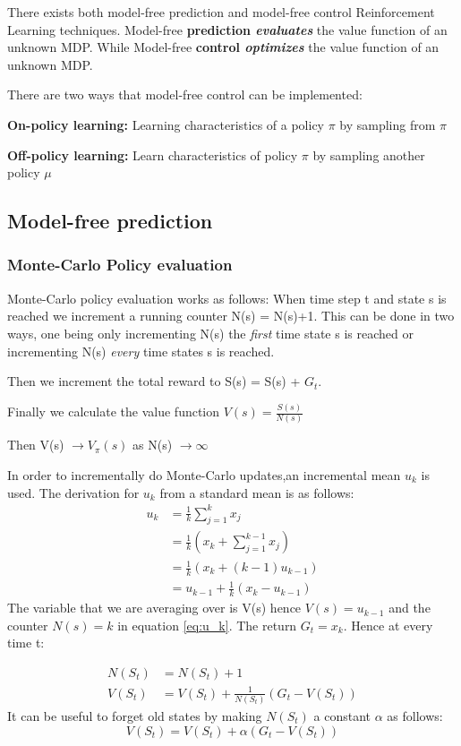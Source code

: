 There exists both model-free prediction and model-free control Reinforcement Learning techniques.
Model-free \textbf{prediction \textit{evaluates}} the value function of an unknown MDP.
While Model-free \textbf{control \textit{optimizes}} the value function of an unknown MDP.

There are two ways that model-free control can be implemented:

\textbf{On-policy learning:}
Learning characteristics of a policy $\pi$ by sampling from $\pi$

\textbf{Off-policy learning:}
Learn characteristics of policy $\pi$ by sampling another policy $\mu$

\subsection{Model-free prediction}
\subsubsection{Monte-Carlo Policy evaluation}
Monte-Carlo policy evaluation works as follows:
When time step t and state s is reached we increment a running counter N(s) = N(s)+1. This can be done in two ways, one being only incrementing N(s) the \textit{first} time state s is reached or incrementing N(s) \textit{every} time states s is reached.

Then we increment the total reward to S(s) =  S(s) + $G_t$.

Finally we calculate the value function $V(s)=\frac{S(s)}{N(s)}$

Then V(s) $\to V_\pi(s)$ as N(s) $\to \infty$

In order to incrementally do Monte-Carlo updates,an incremental mean $u_k$ is used. The derivation for $u_k$ from a standard mean is as follows:
\begin{align}
	u_k &= \frac{1}{k}\sum_{j=1}^{k}x_j\\
	&= \frac{1}{k}(x_k + \sum_{j=1}^{k-1}x_j)\\
	&= \frac{1}{k}(x_k +(k-1)u_{k-1})\\
	&= u_{k-1} + \frac{1}{k}(x_k - u_{k-1})
	\label{eq:u_k}
\end{align}
The variable that we are averaging over is V(s) hence $V(s)=u_{k-1}$ and the counter $N(s)=k$ in equation \ref{eq:u_k}. The return $G_t =x_k$. Hence at every time t:

\begin{align}
	N(S_t) &= N(S_t) + 1 \\
	V(S_t) &= V(S_t) + \frac{1}{N(S_t)}(G_t - V(S_t))
\end{align}
It can be useful to forget old states by making $N(S_t)$ a constant $\alpha$ as follows:
\begin{equation}
	V(S_t) = V(S_t) + \alpha(G_t - V(S_t))
	\label{eq:monte_carlo}
\end{equation}


